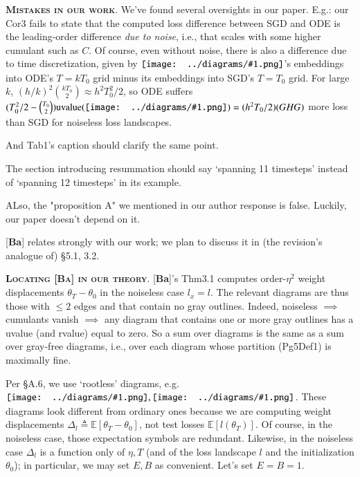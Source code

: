 \documentclass[12pt]{article}
\newcommand{\EE}{\mathbb{E}}
\newcommand{\cor}[1]{\textmd{{\color{gray}Cor}{#1}}}
\newcommand{\dfn}[1]{\textmd{\textsf{Def#1}}}
\newcommand{\pag}[1]{\textmd{{\color{gray}Pg}{#1}}}
\newcommand{\thm}[1]{\textmd{{\color{gray}Thm}{#1}}}
\newcommand{\tab}[1]{\textmd{{\color{gray}Tab}{#1}}}
\newcommand{\cit}[1]{[\textbf{#1}]}
\newcommand{\moosect}[1]{\par\noindent\hspace{-1cm}\textsc{\textbf{#1}}.}
\newcommand{\sizeddia}[2]{%
    \begin{gathered}%
        \texttt{[image: ../diagrams/\#1.png]}%
    \end{gathered}%
}
\newcommand{\mdia}[1]{\protect \sizeddia{#1}{0.14}}
\begin{document}

    \newcommand{\LaT}{\Lambda_{\text{\tiny\VarClock}}}
    \newcommand{\Lad}{\Lambda_{\text{\tiny\Thermo{4}}}}


\moosect{Mistakes in our work}
    We've found several oversights in our paper.
    E.g.: our \cor{3} fails to state that the computed loss difference
    between SGD and ODE is the leading-order difference \emph{due to noise},
    i.e., that scales with some higher cumulant such as $C$.  Of course, even
    without noise, there is also a difference due to time discretization, given
    by $\mdia{c(0-1-2)(01-12)}$'s embeddings into ODE's $T=kT_0$ grid minus
    its embeddings into SGD's $T=T_0$ grid.  For large $k$, $(h/k)^2
    {kT_0\choose 2}\approx h^2T_0^2/2$, so ODE suffers $(T_0^2/2 - {T_0\choose
    2}) \text{uvalue}(\mdia{c(0-1-2)(01-12)}) = (h^2 T_0/2)(GHG)$ more loss
    than SGD for noiseless loss landscapes.

    And \tab{1}'s caption should clarify the same point. 

    The section introducing resummation should say `spanning 11 timesteps'
    instead of `spanning 12 timesteps' in its example.

    ALso, the "proposition A" we mentioned in our author response is false.
    Luckily, our paper doesn't depend on it.

    \par\noindent\hrulefill
    \par\noindent\hrulefill

    \cit{Ba}
    relates strongly with our work; we plan to discuss it in (the revision's
    analogue of) \S{5.1, 3.2}.

\moosect{Locating \cit{Ba} in our theory}
    \cit{Ba}'s \thm{3.1} computes order-$\eta^2$ weight
    displacements $\theta_T-\theta_0$ in the noiseless case $l_x=l$.  The
    relevant diagrams are thus those with $\leq 2$ edges and that contain no
    gray outlines.
    Indeed, noiseless $\implies$ cumulants vanish $\implies$ any diagram that
    contains one or more gray outlines has a uvalue (and rvalue) equal to
    zero.  So a sum over diagrams is the same as a sum over gray-free diagrams,
    i.e., over each diagram whose partition (\pag{5}\dfn{1}) is maximally fine.

    Per \S{A.6}, we use `rootless' diagrams, e.g.\
    $\mdia{MOOc(0-1)(01-1)}, \mdia{MOOc(0-1-2)(01-12-2)}$.  These diagrams look
    different from ordinary ones because we are computing weight displacements
    $\Delta_l \triangleq \EE[\theta_T-\theta_0]$, not test losses
    $\EE[l(\theta_T)]$.  Of course, in the noiseless case, those expectation
    symbols are redundant.  Likewise, in the noiseless case $\Delta_l$ is a
    function only of $\eta, T$ (and of the loss landscape $l$ and the
    initialization $\theta_0$); in particular, we may set $E,B$ as convenient.
    Let's set $E=B=1$.
\end{document}

